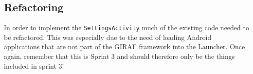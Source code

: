 \subsection{Refactoring}\label{sect:sprint3:refactoring}
In order to implement the \lstinline!SettingsActivity! much of the existing code needed to be refactored.
This was especially due to the need of loading Android applications that are not part of the GIRAF framework  into the Launcher. 
Once again, remember that this is Sprint 3 and should therefore only be the things included in sprint 3!